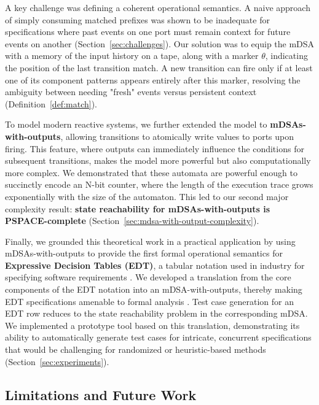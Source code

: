 A key challenge was defining a coherent operational semantics. A naive approach of simply consuming matched prefixes was shown to be inadequate for specifications where past events on one port must remain context for future events on another (Section~\ref{sec:challenges}). Our solution was to equip the mDSA with a memory of the input history on a tape, along with a marker \(\theta\), indicating the position of the last transition match. A new transition can fire only if at least one of its component patterns appears entirely after this marker, resolving the ambiguity between needing "fresh" events versus persistent context (Definition~\ref{def:match}).

To model modern reactive systems, we further extended the model to \textbf{mDSAs-with-outputs}, allowing transitions to atomically write values to ports upon firing. This feature, where outputs can immediately influence the conditions for subsequent transitions, makes the model more powerful but also computationally more complex. We demonstrated that these automata are powerful enough to succinctly encode an N-bit counter, where the length of the execution trace grows exponentially with the size of the automaton. This led to our second major complexity result: \textbf{state reachability for mDSAs-with-outputs is PSPACE-complete} (Section~\ref{sec:mdsa-with-output-complexity}).

Finally, we grounded this theoretical work in a practical application by using mDSAs-with-outputs to provide the first formal operational semantics for \textbf{Expressive Decision Tables (EDT)}, a tabular notation used in industry for specifying software requirements \cite{DBLP:conf/date/VenkateshSKA14, DBLP:conf/icst/AgrawalVSZV20}. We developed a translation from the core components of the EDT notation into an mDSA-with-outputs, thereby making EDT specifications amenable to formal analysis \cite[Section 5.1]{Keerthan2025netys}. Test case generation for an EDT row reduces to the state reachability problem in the corresponding mDSA. We implemented a prototype tool based on this translation, demonstrating its ability to automatically generate test cases for intricate, concurrent specifications that would be challenging for randomized or heuristic-based methods (Section~\ref{sec:experiments}).

\subsection*{Limitations and Future Work}

